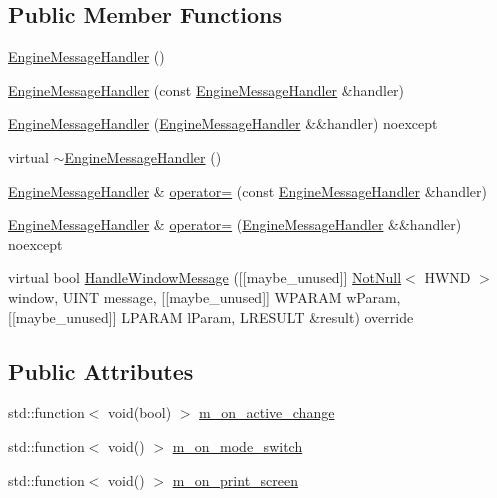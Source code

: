 \subsection*{Public Member Functions}
\begin{DoxyCompactItemize}
\item 
\mbox{\hyperlink{classmage_1_1_engine_message_handler_a1d3e248f3b2b314e5a277a8397f08780}{Engine\+Message\+Handler}} ()
\item 
\mbox{\hyperlink{classmage_1_1_engine_message_handler_a02124b51211515e5bb93b0a1c3250a8c}{Engine\+Message\+Handler}} (const \mbox{\hyperlink{classmage_1_1_engine_message_handler}{Engine\+Message\+Handler}} \&handler)
\item 
\mbox{\hyperlink{classmage_1_1_engine_message_handler_ab771829274e6ab899b4499926f504667}{Engine\+Message\+Handler}} (\mbox{\hyperlink{classmage_1_1_engine_message_handler}{Engine\+Message\+Handler}} \&\&handler) noexcept
\item 
virtual \mbox{\hyperlink{classmage_1_1_engine_message_handler_a458f16ad9f68ad1e908e4d275c383c2c}{$\sim$\+Engine\+Message\+Handler}} ()
\item 
\mbox{\hyperlink{classmage_1_1_engine_message_handler}{Engine\+Message\+Handler}} \& \mbox{\hyperlink{classmage_1_1_engine_message_handler_a567c60f09df9fed3c725ab215e9afbe6}{operator=}} (const \mbox{\hyperlink{classmage_1_1_engine_message_handler}{Engine\+Message\+Handler}} \&handler)
\item 
\mbox{\hyperlink{classmage_1_1_engine_message_handler}{Engine\+Message\+Handler}} \& \mbox{\hyperlink{classmage_1_1_engine_message_handler_a77538e900f5c92e4da88de5042ca5f4c}{operator=}} (\mbox{\hyperlink{classmage_1_1_engine_message_handler}{Engine\+Message\+Handler}} \&\&handler) noexcept
\item 
virtual bool \mbox{\hyperlink{classmage_1_1_engine_message_handler_ab5dfd682d7ecc9d5d1c062d82143bca7}{Handle\+Window\+Message}} (\mbox{[}\mbox{[}maybe\+\_\+unused\mbox{]}\mbox{]} \mbox{\hyperlink{namespacemage_a8769f9d670d6b585ea306cb1062af94b}{Not\+Null}}$<$ H\+W\+ND $>$ window, U\+I\+NT message, \mbox{[}\mbox{[}maybe\+\_\+unused\mbox{]}\mbox{]} W\+P\+A\+R\+AM w\+Param, \mbox{[}\mbox{[}maybe\+\_\+unused\mbox{]}\mbox{]} L\+P\+A\+R\+AM l\+Param, L\+R\+E\+S\+U\+LT \&result) override
\end{DoxyCompactItemize}
\subsection*{Public Attributes}
\begin{DoxyCompactItemize}
\item 
std\+::function$<$ void(bool) $>$ \mbox{\hyperlink{classmage_1_1_engine_message_handler_a16317d998acb4511b1028b8e6e88027b}{m\+\_\+on\+\_\+active\+\_\+change}}
\item 
std\+::function$<$ void() $>$ \mbox{\hyperlink{classmage_1_1_engine_message_handler_ab1b4379bdda3e37fa2e71e482ae7904a}{m\+\_\+on\+\_\+mode\+\_\+switch}}
\item 
std\+::function$<$ void() $>$ \mbox{\hyperlink{classmage_1_1_engine_message_handler_adbe3af5dfc6ca46e7a41b8261ac82c3f}{m\+\_\+on\+\_\+print\+\_\+screen}}
\end{DoxyCompactItemize}


